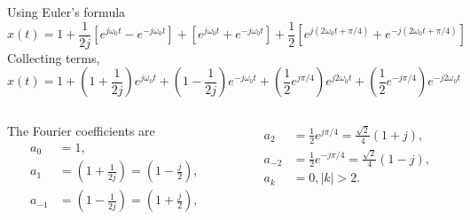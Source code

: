 \begin{frame}
        Using Euler's formula
        \begin{equation*}
            x(t) = 1 + \frac{1}{2j}\left[e^{j\omega_0 t} - e^{-j\omega_0 t}\right] + \left[e^{j\omega_0 t} + e^{-j\omega_0 t}\right] + \frac{1}{2}\left[e^{j(2\omega_0 t + \pi/4)} + e^{-j(2\omega_0 t + \pi/4)}\right]
        \end{equation*}
        \pause
        Collecting terms,
        \begin{equation*}
            x(t) = 1 + \left(1 + \frac{1}{2j}\right)e^{j\omega_0 t} +  \left(1 - \frac{1}{2j}\right)e^{-j\omega_0 t} + \left(\frac{1}{2} e^{j\pi/4}\right)e^{j2\omega_0 t} + \left(\frac{1}{2} e^{-j\pi/4}\right)e^{-j2\omega_0 t}
        \end{equation*}
        \pause
        \begin{columns}
            \begin{column}{0.5\textwidth}
                The Fourier coefficients are
                \begin{equation*}
                    \begin{split}
                        a_0 &= 1,\\
                        a_1 &= \left(1 + \frac{1}{2j}\right) = \left(1 - \frac{j}{2}\right),\\
                        a_{-1} &= \left(1 - \frac{1}{2j}\right) = \left(1 + \frac{j}{2}\right),\\
                    \end{split}
                \end{equation*}
            \end{column}
            \begin{column}{0.5\textwidth}
                \begin{equation*}
                    \begin{split}
                        a_2 &= \frac{1}{2}e^{j\pi/4} = \frac{\sqrt{2}}{4}(1+j),\\
                        a_{-2} &= \frac{1}{2}e^{-j\pi/4} = \frac{\sqrt{2}}{4}(1-j),\\
                        a_k &= 0, |k|>2.
                    \end{split}
                \end{equation*}
            \end{column}
        \end{columns}

\end{frame}

